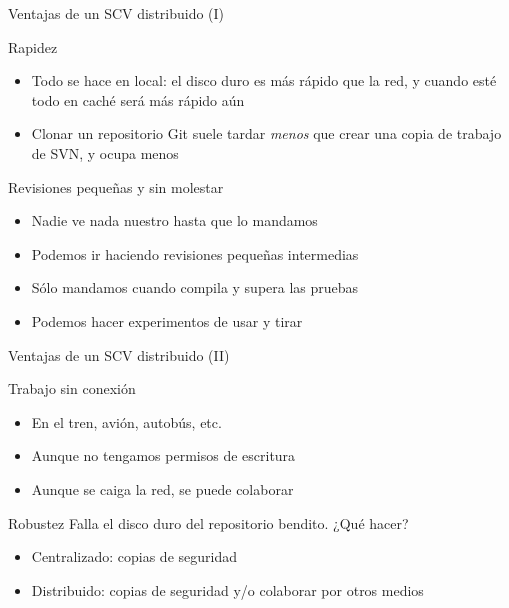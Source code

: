 \documentclass[xcolor=svgnames]{beamer}
\begin{document}
\begin{frame}{Ventajas de un SCV distribuido (I)}

  \begin{block}{Rapidez}
    \begin{itemize}
    \item Todo se hace en local: el disco duro es más rápido que la
      red, y cuando esté todo en caché será más rápido aún
    \item Clonar un repositorio Git suele tardar \emph{menos} que
      crear una copia de trabajo de SVN, y ocupa menos
    \end{itemize}
  \end{block}

  \pause

  \begin{block}{Revisiones pequeñas y sin molestar}
    \begin{itemize}
    \item Nadie ve nada nuestro hasta que lo mandamos
    \item Podemos ir haciendo revisiones pequeñas intermedias
    \item Sólo mandamos cuando compila y supera las pruebas
    \item Podemos hacer experimentos de usar y tirar
    \end{itemize}
  \end{block}

\end{frame}

\begin{frame}{Ventajas de un SCV distribuido (II)}
  \begin{block}{Trabajo sin conexión}
    \begin{itemize}
    \item En el tren, avión, autobús, etc.
    \item Aunque no tengamos permisos de escritura
    \item Aunque se caiga la red, se puede colaborar
    \end{itemize}
  \end{block}

  \pause

  \begin{block}{Robustez}
    Falla el disco duro del repositorio bendito. ¿Qué hacer?
    \begin{itemize}
    \item Centralizado: copias de seguridad
    \item Distribuido: copias de seguridad y/o colaborar por otros medios
    \end{itemize}
  \end{block}
\end{frame}
\end{document}
